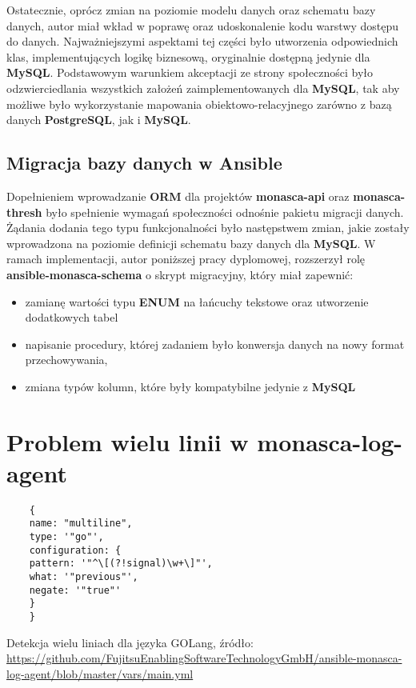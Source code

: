     Ostatecznie, oprócz zmian na poziomie modelu danych oraz schematu bazy danych, autor miał wkład w poprawę oraz udoskonalenie
    kodu warstwy dostępu do danych. Najważniejszymi aspektami tej części było utworzenia odpowiednich klas, implementujących logikę
    biznesową, oryginalnie dostępną jedynie dla \textbf{MySQL}. Podstawowym warunkiem akceptacji ze strony społeczności było
    odzwierciedlania wszystkich założeń zaimplementowanych dla \textbf{MySQL}, tak aby możliwe było wykorzystanie mapowania obiektowo-relacyjnego
    zarówno z bazą danych \textbf{PostgreSQL}, jak i \textbf{MySQL}.
    
    \subsection{Migracja bazy danych w Ansible}
    Dopełnieniem wprowadzanie \textbf{ORM} dla projektów \textbf{monasca-api} oraz \textbf{monasca-thresh} było spełnienie
    wymagań społeczności odnośnie pakietu migracji danych. Żądania dodania tego typu funkcjonalności było następstwem zmian, jakie
    zostały wprowadzona na poziomie definicji schematu bazy danych dla \textbf{MySQL}. W ramach implementacji, autor poniższej pracy dyplomowej,
    rozszerzył rolę \textbf{ansible-monasca-schema} o skrypt migracyjny, który miał zapewnić:
    \begin{itemize}
        \item zamianę wartości typu \textbf{ENUM} na łańcuchy tekstowe oraz utworzenie dodatkowych tabel
        \item napisanie procedury, której zadaniem było konwersja danych na nowy format przechowywania,
        \item zmiana typów kolumn, które były kompatybilne jedynie z \textbf{MySQL}
    \end{itemize}

\section{Problem wielu linii w monasca-log-agent}
\label{chapter:application_own:own_work:monasca_log_agent}

\begin{listing}[h]
    \begin{verbatim}
    {
    name: "multiline",
    type: '"go"',
    configuration: {
    pattern: '"^\[(?!signal)\w+\]"',
    what: '"previous"',
    negate: '"true"'
    }
    }
    \end{verbatim}
    \caption[Detekcja wielu liniach dla języka GOLang]{
        Detekcja wielu liniach dla języka GOLang, źródło: \url{https://github.com/FujitsuEnablingSoftwareTechnologyGmbH/ansible-monasca-log-agent/blob/master/vars/main.yml}}
    \label{chapter:application_own:own_work:monasca_log_agent:filter_example}
\end{listing}

